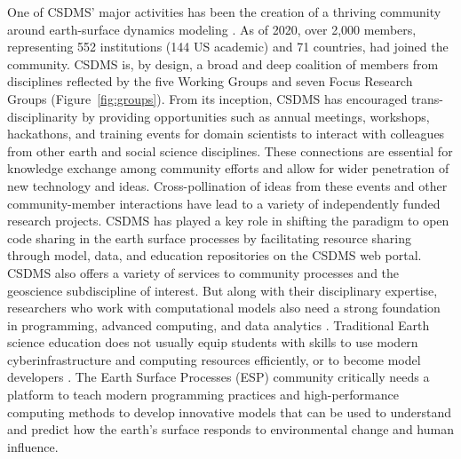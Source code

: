 \documentclass[12pt]{amsart}
\begin{document}
One of CSDMS' major activities has been the creation of a thriving community around earth-surface dynamics modeling \citep{overeem2013strategies}. As of 2020, over 2,000 members, representing 552 institutions (144 US academic) and 71 countries, had joined the community.  CSDMS is, by design, a broad and deep coalition of members from disciplines reflected by the five Working Groups and seven Focus Research Groups (Figure~\ref{fig:groups}).  From its inception, CSDMS has encouraged trans-disciplinarity by providing opportunities such as annual meetings, workshops, hackathons, and training events for domain scientists to interact with colleagues from other earth and social science disciplines.  These connections are essential for knowledge exchange among community efforts and allow for wider penetration of new technology and ideas. Cross-pollination of ideas from these events and other community-member interactions have lead to a variety of independently funded research projects. CSDMS has played a key role in shifting the paradigm to open code sharing in the earth surface processes by facilitating resource sharing through model, data, and education repositories on the CSDMS web portal.  CSDMS also offers a variety of services to community processes and the geoscience subdiscipline of interest.  But along with their disciplinary expertise, researchers who work with computational models also need a strong foundation in programming, advanced computing, and data analytics  \citep{atkins2011national}.
Traditional Earth science education does not usually equip students with skills to use modern cyberinfrastructure and computing resources efficiently, or to become model developers \citep{campbell2013taking}. The Earth Surface Processes (ESP) community critically needs a platform to teach modern programming practices and high-performance computing methods to develop innovative models that can be used to understand and predict how the earth’s surface responds to environmental change and human influence.
\end{document}

